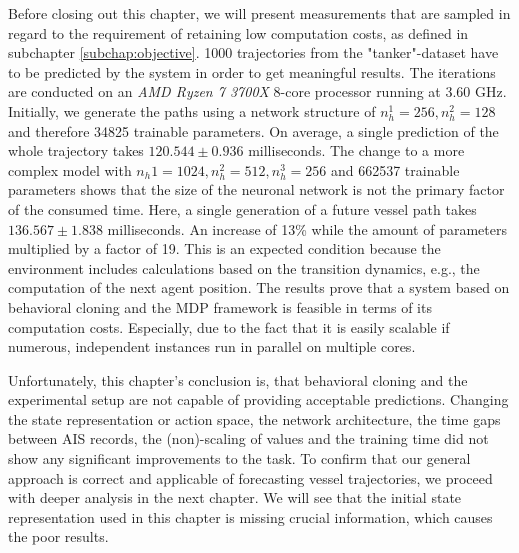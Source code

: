 Before closing out this chapter, we will present measurements that are sampled in regard to the requirement of retaining low computation costs, as defined in subchapter \ref{subchap:objective}. 1000 trajectories from the "tanker"-dataset have to be predicted by the system in order to get meaningful results. The iterations are conducted on an \textit{AMD Ryzen 7 3700X} 8-core processor running at 3.60 GHz. Initially, we generate the paths using a network structure of $n_h^1=256, n_h^2=128$ and therefore 34825 trainable parameters. On average, a single prediction of the whole trajectory takes $120.544 \pm 0.936$ milliseconds. The change to a more complex model with $n_h1=1024, n_h^2=512, n_h^3=256$ and 662537 trainable parameters shows that the size of the neuronal network is not the primary factor of the consumed time. Here, a single generation of a future vessel path takes $136.567 \pm 1.838$ milliseconds. An increase of 13\% while the amount of parameters multiplied by a factor of 19. This is an expected condition because the environment includes calculations based on the transition dynamics, e.g., the computation of the next agent position. The results prove that a system based on behavioral cloning and the MDP framework is feasible in terms of its computation costs. Especially, due to the fact that it is easily scalable if numerous, independent instances run in parallel on multiple cores.
\par
Unfortunately, this chapter's conclusion is, that behavioral cloning and the experimental setup are not capable of providing acceptable predictions.
Changing the state representation or action space, the network architecture, the time gaps between AIS records, the (non)-scaling of values and the training time did not show any significant improvements to the task. To confirm that our general approach is correct and applicable of forecasting vessel trajectories, we proceed with deeper analysis in the next chapter. We will see that the initial state representation used in this chapter is missing crucial information, which causes the poor results. 